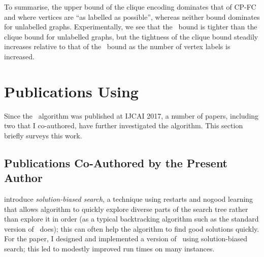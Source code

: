 To summarise, the upper bound of the clique encoding
dominates that of CP-FC and \McSplit where vertices are ``as labelled as possible'',
whereas neither bound dominates for unlabelled graphs.  Experimentally, we
see that the \McSplit\ bound is tighter than the clique bound for unlabelled
graphs, but the tightness of the clique bound steadily increases
relative to that of the \McSplit\ bound as the number of vertex
labels is increased.


\section{Publications Using \McSplit}\label{sec:mcsplit-papers}

Since the \McSplit\ algorithm was published at IJCAI 2017, a number of papers, including
two that I co-authored, have further investigated the algorithm.
This section briefly surveys this work.

\subsection{Publications Co-Authored by the Present Author}

\citet{DBLP:conf/cpaior/ArchibaldDHMP019} introduce \emph{solution-biased search},
a technique using restarts and nogood learning that allows algorithm to quickly explore diverse
parts of the search tree rather than explore it in order (as a typical backtracking algorithm
such as the standard version of \McSplit\ does); this can often help the algorithm to find good
solutions quickly.  For the paper, I designed and implemented a version
of \McSplit\ using solution-biased search; this led to modestly improved run times on many instances.

